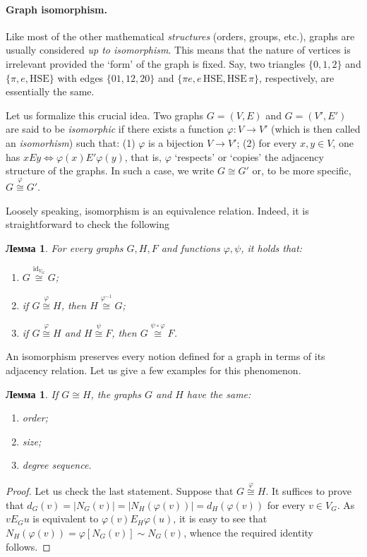 \documentclass[12pt,notitlepage]{article}
\theoremstyle{plain}
\newtheorem{lemma}[thm]{Лемма}
\theoremstyle{definition}
\theoremstyle{plain}
\renewcommand{\phi}{\varphi}
\newcommand{\id}{\mathrm{id}}
\newcommand{\1}{\mathbf{1}}
\newcommand{\0}{\mathbf{0}}
\begin{document}
\paragraph{Graph isomorphism.} Like most of the other mathematical \emph{structures} (orders, groups, etc.), graphs are usually considered \emph{up to isomorphism}. This means that the nature of vertices is irrelevant provided the `form' of the graph is fixed. Say, two triangles $\{0, 1, 2\}$ and $\{\pi, e, \mathrm{HSE}\}$ with edges $\{01, 12, 20 \}$ and $\{ \pi e, e\, \mathrm{HSE}, \mathrm{HSE}\, \pi \}$, respectively, are essentially the same.

Let us formalize this crucial idea. Two graphs $G = (V, E)$ and $G = (V', E')$ are said to be \emph{isomorphic} if there exists a function $\phi \colon V \to V'$ (which is then called an \emph{isomorhism}) such that: (1) $\phi$ is a bijection $V \to V'$; (2) for every $x, y \in V$, one has $x E y \iff \phi(x) E' \phi(y)$, that is, $\phi$ `respects' or `copies' the adjacency structure of the graphs. In such a case, we write $G \cong G'$ or, to be more specific, $G \stackrel{\phi}{\cong} G'$.

Loosely speaking, isomorphism is an equivalence relation. Indeed, it is straightforward to check the following
\begin{lemma} For every graphs $G, H, F$ and functions $\phi, \psi$, it holds that:
	\begin{enumerate}
		\item $G \stackrel{\id_{V_G}}{\cong} G$;
		\item if $G \stackrel{\phi}{\cong} H$, then $H \stackrel{\phi^{-1}}{\cong} G$;
		\item if $G \stackrel{\phi}{\cong} H$ and $H \stackrel{\psi}{\cong} F$, then $G \stackrel{\psi \circ \phi}{\cong} F$.
	\end{enumerate}
\end{lemma}

An isomorphism preserves every notion defined for a graph in terms of its adjacency relation. Let us give a few examples for this phenomenon.
\begin{lemma} If $G \cong H$, the graphs $G$ and $H$ have the same:
	\begin{enumerate}
		\item order;
		\item size;
		\item degree sequence.
	\end{enumerate}
\end{lemma}
\begin{proof}
	Let us check the last statement. Suppose that $G \stackrel{\phi}{\cong} H$. It suffices to prove that $d_G(v) = |N_G(v)| = |N_H(\phi(v))| = d_H(\phi(v))$ for every $v \in V_G$. As $v E_G u$ is equivalent to $\phi(v) E_H \phi(u)$, it is easy to see that $N_H(\phi(v)) = \phi[N_G(v)] \sim N_G(v)$, whence the required identity follows.
\end{proof}
\end{document}
